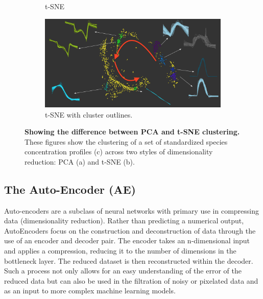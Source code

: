 \begin{figure}[H]
\begin{subfigure}[b]{0.495\textwidth}
         \caption{t-SNE}
         \label{fig:tsnec}
     \end{subfigure}
     \hfill \hfill
     \begin{subfigure}[b]{\textwidth}
         \centering
         \includegraphics[width=\textwidth]{4fig/ptsneall.png}
         \caption{t-SNE with cluster outlines.}
         \label{fig:tco}
     \end{subfigure}
        \caption{\textbf{Showing the difference between PCA and t-SNE clustering.} These figures show the clustering of a set of standardized species concentration profiles (c) across two styles of dimensionality reduction: PCA (a) and t-SNE (b). }
        \label{fig:threegraphs}
\end{figure}




\subsection{The Auto-Encoder (AE)}\label{sec:ae}
Auto-encoders are a subclass of neural networks with primary use in compressing data (dimensionality reduction). Rather than predicting a numerical output, AutoEncoders focus on the construction and deconstruction of data through the use of an encoder and decoder pair. The encoder takes an n-dimensional input and applies a compression, reducing it to the number of dimensions in the bottleneck layer. The reduced dataset is then reconstructed within the decoder. Such a process not only allows for an easy understanding of the error of the reduced data but can also be used in the filtration of noisy or pixelated data \citep{aenoise,aeim} and as an input to more complex machine learning models.\


